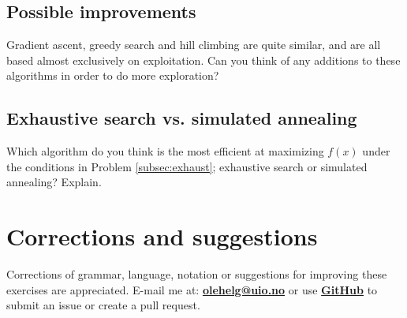 \documentclass{article}           %
\begin{document}
\subsection{Possible improvements}
Gradient ascent, greedy search and hill climbing are quite similar, and are all based almost exclusively on exploitation.
Can you think of any additions to these algorithms in order to do more exploration?

\subsection{Exhaustive search vs. simulated annealing}
Which algorithm do you think is the most efficient at maximizing \(f(x)\) under the conditions in Problem \ref{subsec:exhaust};
exhaustive search or simulated annealing? Explain.
\section*{Corrections and suggestions}
Corrections of grammar, language, notation or suggestions for improving these exercises are appreciated.
E-mail me at: \href{mailto:olehelg@uio.no}{\textbf{olehelg@uio.no}} or use
\href{https://github.com/olehermanse/INF3490-AI_Machine_Learning}{\textbf{GitHub}}
to submit an issue or create a pull request.
\end{document}
